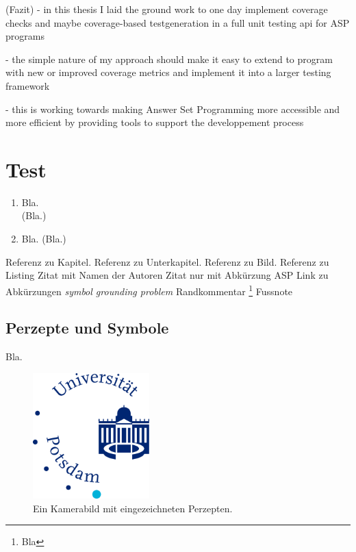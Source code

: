 (Fazit)
- in this thesis I laid the ground work to one day implement coverage checks and maybe coverage-based testgeneration in a full unit 
testing api for ASP programs

- the simple nature of my approach should make it easy to extend to program with new or improved coverage metrics and implement it 
into a larger testing framework

- this is working towards making Answer Set Programming more accessible and more efficient by providing tools to support the 
developpement process



\chapter{Test}
\label{ch:Test}

\begin{enumerate}
    \item Bla.\\
    (Bla.)
    \item Bla. (Bla.)
\end{enumerate}

 Referenz zu Kapitel.
 Referenz zu Unterkapitel. 
 Referenz zu Bild.
 Referenz zu Listing
\textcite{Jan+10} Zitat mit Namen der Autoren
\cite{Jan+10} Zitat nur mit Abkürzung
\ac{ASP} Link zu Abkürzungen
\emph{symbol grounding problem} 
 Randkommentar
\footnote{Bla} Fussnote

\section{Perzepte und Symbole}
\label{sec:Test/Perzepte_und_Symbole}
Bla.


\begin{figure}
    \centering
    \includegraphics[width=0.4\textwidth]{gfx/unilogo.jpg}
    \caption{Ein Kamerabild mit eingezeichneten Perzepten.}
    \label{fig:cups_yolo}
\end{figure}


